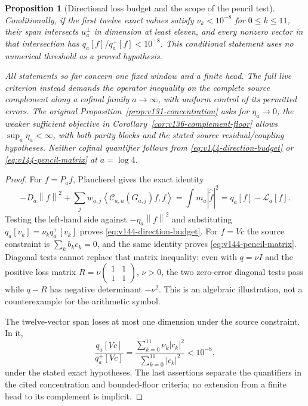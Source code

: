 \documentclass[11pt]{article}
\newtheorem{proposition}[theorem]{Proposition}
\theoremstyle{remark}
\newcommand{\norm}[1]{\left\lVert #1\right\rVert}
\newcommand{\ip}[2]{\left\langle #1,#2\right\rangle}
\begin{document}
\begin{proposition}[Directional loss budget and the scope of the pencil test]
Conditionally, if the first twelve \emph{exact} values satisfy
$\nu_k<10^{-8}$ for $0\le k\le11$, their span intersects $u_a^\perp$
in dimension at least eleven, and every nonzero vector in that
intersection has $q_a[f]/q_a^+[f]<10^{-8}$. This conditional statement
uses no numerical threshold as a proved hypothesis.

All statements so far concern one fixed window and a finite head.
The full live criterion instead demands the operator inequality on
the complete source complement along a cofinal family $a\to\infty$,
with uniform control of its permitted errors. The original
Proposition~\ref{prop:v131-concentration} asks for $\eta_a\to0$;
the weaker sufficient objective in
Corollary~\ref{cor:v136-complement-floor} allows
$\sup_a\eta_a<\infty$, with both parity blocks and the stated source
residual/coupling hypotheses. Neither cofinal quantifier follows
from \eqref{eq:v144-direction-budget} or
\eqref{eq:v144-pencil-matrix} at $a=\log4$.
\end{proposition}
\begin{proof}
For $f=P_af$, Plancherel gives the exact identity
\[
 -D_a\norm f^2+\sum_jw_{a,j}
       \ip{\mathcal C_{a,u}(G_{a,j})f}f
 =\int m_a|\widehat{\widetilde f}|^2
 =q_a[f]-\mathcal L_a[f].
\]
Testing the left-hand side against $-\eta_a\norm f^2$ and substituting
$q_a[v_k]=\nu_kq_a^+[v_k]$ proves
\eqref{eq:v144-direction-budget}. For $f=Vc$ the source constraint is
$\sum_kb_kc_k=0$, and the same identity proves
\eqref{eq:v144-pencil-matrix}. Diagonal tests cannot replace that
matrix inequality: even with $q=\nu I$ and the positive loss matrix
$R=\nu\left(\begin{smallmatrix}1&1\\1&1\end{smallmatrix}\right)$,
$\nu>0$, the two zero-error diagonal tests pass while $q-R$ has
negative determinant $-\nu^2$. This is an algebraic illustration,
not a counterexample for the arithmetic symbol.

The twelve-vector span loses at most one dimension under the source
constraint. In it,
\[
 \frac{q_a[Vc]}{q_a^+[Vc]}
   =\frac{\sum_{k=0}^{11}\nu_k|c_k|^2}
          {\sum_{k=0}^{11}|c_k|^2}<10^{-8},
\]
under the stated exact hypotheses. The last assertions separate the
quantifiers in the cited concentration and bounded-floor criteria;
no extension from a finite head to its complement is implicit.
\end{proof}
\end{document}
